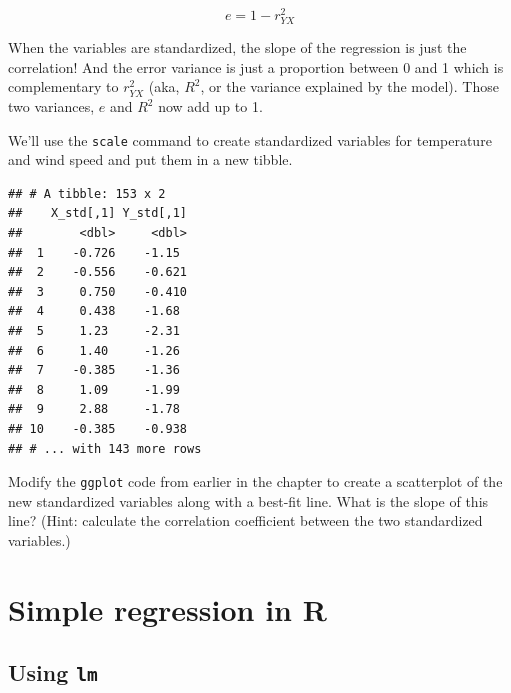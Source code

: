 \documentclass[
]{book}
\newenvironment{Shaded}{\begin{snugshade}}{\end{snugshade}}
\newcommand{\FunctionTok}[1]{\textcolor[rgb]{0.00,0.00,0.00}{#1}}
\newcommand{\NormalTok}[1]{#1}
\newcommand{\OtherTok}[1]{\textcolor[rgb]{0.56,0.35,0.01}{#1}}
\newcommand{\SpecialCharTok}[1]{\textcolor[rgb]{0.00,0.00,0.00}{#1}}
\begin{document}
\[
e = 1 - r_{YX}^{2}
\]

When the variables are standardized, the slope of the regression is just the correlation! And the error variance is just a proportion between 0 and 1 which is complementary to \(r_{YX}^{2}\) (aka, \(R^{2}\), or the variance explained by the model). Those two variances, \(e\) and \(R^{2}\) now add up to 1.

We'll use the \texttt{scale} command to create standardized variables for temperature and wind speed and put them in a new tibble.

\begin{Shaded}
\end{Shaded}

\begin{verbatim}
## # A tibble: 153 x 2
##    X_std[,1] Y_std[,1]
##        <dbl>     <dbl>
##  1    -0.726    -1.15 
##  2    -0.556    -0.621
##  3     0.750    -0.410
##  4     0.438    -1.68 
##  5     1.23     -2.31 
##  6     1.40     -1.26 
##  7    -0.385    -1.36 
##  8     1.09     -1.99 
##  9     2.88     -1.78 
## 10    -0.385    -0.938
## # ... with 143 more rows
\end{verbatim}

Modify the \texttt{ggplot} code from earlier in the chapter to create a scatterplot of the new standardized variables along with a best-fit line. What is the slope of this line? (Hint: calculate the correlation coefficient between the two standardized variables.)

\hypertarget{simple-r}{%
\section{Simple regression in R}\label{simple-r}}

\hypertarget{simple-r-lm}{%
\subsection{\texorpdfstring{Using \texttt{lm}}{Using lm}}\label{simple-r-lm}}
\end{document}
